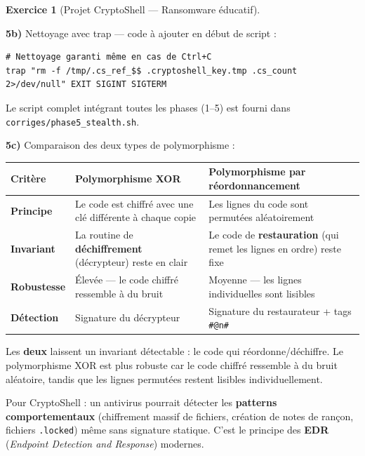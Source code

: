\documentclass[a4paper,11pt]{article}
\theoremstyle{plain}
\theoremstyle{definition}
\newtheorem{exercice}{Exercice}
\begin{document}
\begin{exercice}[Projet CryptoShell --- Ransomware éducatif]
\begin{correction}
\textbf{5b)} Nettoyage avec trap --- code à ajouter en début de script :
\begin{lstlisting}[title=Nettoyage avec trap (5b)]
# Nettoyage garanti même en cas de Ctrl+C
trap "rm -f /tmp/.cs_ref_$$ .cryptoshell_key.tmp .cs_count 2>/dev/null" EXIT SIGINT SIGTERM
\end{lstlisting}

Le script complet intégrant toutes les phases (1--5) est fourni dans \texttt{corriges/phase5\_stealth.sh}.

\medskip
\textbf{5c)} Comparaison des deux types de polymorphisme :

\begin{center}
\begin{tabular}{lp{5cm}p{5cm}}
\toprule
\textbf{Critère} & \textbf{Polymorphisme XOR} & \textbf{Polymorphisme par réordonnancement} \\
\midrule
\textbf{Principe} & Le code est chiffré avec une clé différente à chaque copie & Les lignes du code sont permutées aléatoirement \\
\textbf{Invariant} & La routine de \textbf{déchiffrement} (décrypteur) reste en clair & Le code de \textbf{restauration} (qui remet les lignes en ordre) reste fixe \\
\textbf{Robustesse} & Élevée --- le code chiffré ressemble à du bruit & Moyenne --- les lignes individuelles sont lisibles \\
\textbf{Détection} & Signature du décrypteur & Signature du restaurateur + tags \texttt{\#@n\#} \\
\bottomrule
\end{tabular}
\end{center}

Les \textbf{deux} laissent un invariant détectable : le code qui réordonne/déchiffre. Le polymorphisme XOR est plus robuste car le code chiffré ressemble à du bruit aléatoire, tandis que les lignes permutées restent lisibles individuellement.

Pour CryptoShell : un antivirus pourrait détecter les \textbf{patterns comportementaux} (chiffrement massif de fichiers, création de notes de rançon, fichiers \texttt{.locked}) même sans signature statique. C'est le principe des \textbf{EDR} (\textit{Endpoint Detection and Response}) modernes.


\end{correction}
\end{exercice}
\end{document}
